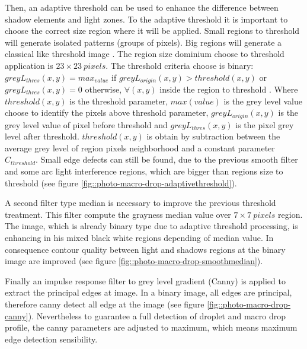 \documentclass[12pt]{iopart}
\begin{document}
Then, an  adaptive threshold can be used to enhance the difference
between shadow elements and light zones. To the adaptive threshold it is important 
to choose the correct size region where it will be applied. Small regions to threshold
will generate isolated patterns (groups of pixels). Big regions will generate
a classical like threshold image \cite{SABER}. The region size dominium choose
to threshold application is $23\times 23\ pixels$. The threshold criteria 
choose is binary: $greyL_{thres}(x,y) = max_{value}$ if $greyL_{origin}(x,y) >  threshold(x,y)$
or $greyL_{thres}(x,y) = 0$ otherwise, $\forall (x,y)$ inside the region
to threshold \cite{OPENCV}. Where $threshold(x,y)$ is the threshold parameter,
 $max(value)$ is the grey level value choose to identify the pixels above
threshold parameter, $greyL_{origin}(x,y)$ is the grey level value of pixel
 before threshold and $greyL_{thres}(x,y)$ is the pixel grey level after threshold.
$threshold(x,y)$ is obtain by subtraction between the average grey level of region
 pixels neighborhood and a constant parameter $C_{threshold}$.  
Small edge defects can still be found, due to the previous smooth filter and some arc 
light interference regions, which are bigger than regions size to
threshold (see figure \ref{fig::photo-macro-drop-adaptivethreshold}).  

A second filter type median is necessary to improve the previous threshold treatment. 
This filter compute the grayness median value over $7\times 7\ pixels$
region. The image, which is already binary type due to adaptive threshold processing,
 is enhancing in his mixed black white regions depending of 
 median value. In consequence contour quality between light and shadows
 regions at the binary image are improved (see figure \ref{fig::photo-macro-drop-smoothmedian}).

Finally an impulse response filter to grey level gradient (Canny) is applied to extract 
the principal edges at image. In a binary image, all edges are principal,
therefore canny detect all edge at the image (see figure \ref{fig::photo-macro-drop-canny}).
Nevertheless to guarantee a full detection of droplet and 
 macro drop profile, the canny parameters are adjusted to maximum, 
which means maximum edge detection sensibility. 
              
\end{document}
